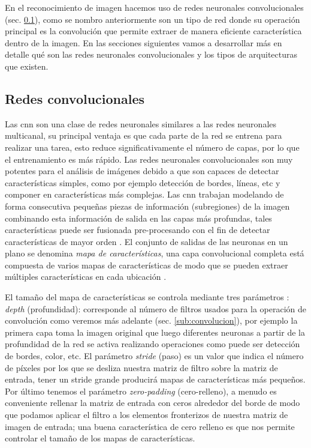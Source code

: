 En el reconocimiento de imagen  hacemos uso de redes neuronales convolucionales (sec. \ref{sub:cnn}), como se nombro anteriormente son un tipo de red donde su operación principal es la convolución que permite extraer de manera eficiente característica dentro de la imagen. En las secciones siguientes vamos a desarrollar más en detalle qué son las redes neuronales convolucionales y los tipos de arquitecturas que existen. 


\subsection{Redes convolucionales}\label{sub:cnn}

Las \ac{cnn} son una clase de redes neuronales  similares a las redes neuronales multicanal, su principal ventaja es que cada parte de la red se entrena para realizar una tarea, esto reduce significativamente el número de capas, por lo que el entrenamiento es más rápido. Las redes neuronales convolucionales son muy potentes para el análisis de imágenes debido a que son capaces de detectar características simples, como por ejemplo detección de bordes, líneas, etc y componer en características más complejas. Las \ac{cnn} trabajan modelando de forma consecutiva pequeñas piezas de información (subregiones) de la imagen combinando esta información de salida en las capas más profundas, tales características puede ser fusionada pre-procesando con el fin de detectar características de mayor orden \citep{murphy}. El conjunto de salidas de las neuronas en un plano se denomina \textit{mapa de características}, una capa convolucional completa está compuesta de varios mapas de características de modo que se pueden extraer múltiples características en cada ubicación \citep{cnns}.

El tamaño del mapa de características se controla mediante tres parámetros \citep{cnnsarticle}: \textit{depth} (profundidad): corresponde al número de filtros usados para la operación de convolución como veremos más adelante (sec. \ref{sub:convolucion}), por ejemplo la primera capa toma la imagen original que luego diferentes neuronas a partir de la profundidad de la red se activa realizando operaciones como puede ser detección de bordes, color, etc. El parámetro \textit{stride} (paso) es un valor que indica el número de píxeles por los que se desliza nuestra matriz de filtro sobre la matriz de entrada, tener un stride grande producirá mapas de características más pequeños. Por último tenemos el parámetro \textit{zero-padding} (cero-relleno), a menudo es conveniente rellenar la matriz de entrada con ceros alrededor del borde de modo que podamos aplicar el filtro a los elementos fronterizos de nuestra matriz de imagen de entrada; una buena característica de cero relleno es que nos permite controlar el tamaño de los mapas de características.

